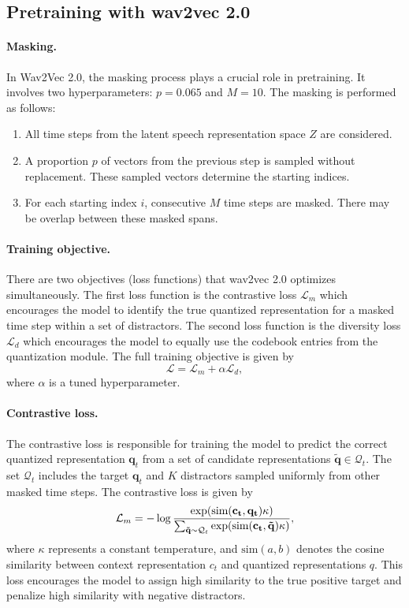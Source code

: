 \subsection{Pretraining with wav2vec 2.0}

\paragraph*{Masking.}
In Wav2Vec 2.0, the masking process plays a crucial role in pretraining. 
It involves two hyperparameters: $p = 0.065$ and $M = 10$. 
The masking is performed as follows:
\begin{enumerate}
    \item All time steps from the latent speech representation space $Z$ are considered.
    \item A proportion $p$ of vectors from the previous step is sampled without replacement. These sampled vectors determine the starting indices.
    \item For each starting index $i$, consecutive $M$ time steps are masked. There may be overlap between these masked spans.
\end{enumerate}

\paragraph*{Training objective.} There are two objectives (loss functions) that wav2vec 2.0 optimizes simultaneously.
The first loss function is the contrastive loss $\mathcal{L}_m$ which encourages the model to
identify the true quantized representation for a masked time step within a set of distractors. 
The second loss function is the diversity loss $\mathcal{L}_d$ which encourages the model 
to equally use the codebook entries from the quantization module.
The full training objective is given by
\begin{equation}
\mathcal{L} = \mathcal{L}_m + \alpha \mathcal{L}_d,
\end{equation}
where $\alpha$ is a tuned hyperparameter.

\paragraph*{Contrastive loss.}
The contrastive loss is responsible for training the model to predict the correct quantized 
representation $\mathbf{q}_t$ from a set of candidate representations $\mathbf{\tilde{q}} \in \mathcal{Q}_t$. 
The set $\mathcal{Q}_t$ includes the target $\mathbf{q}_t$ and $K$ distractors sampled uniformly from other masked time steps. 
The contrastive loss is given by
\begin{equation}
\mathcal{L}_m = -\log \dfrac{\exp(\text{sim}(\mathbf{c_t}, \mathbf{q_t}) \/ \kappa)}{\sum_{\mathbf{\tilde{q}} \sim \mathcal{Q}_t} \exp(\text{sim}(\mathbf{c_t}, \mathbf{\tilde{q}}) \/ \kappa)},
\end{equation}
where $\kappa$ represents a constant temperature, and $\text{sim}(a, b)$ denotes the cosine similarity between 
context representation $c_t$ and quantized representations $q$. 
This loss encourages the model to assign high similarity to the true 
positive target and penalize high similarity with negative distractors.

